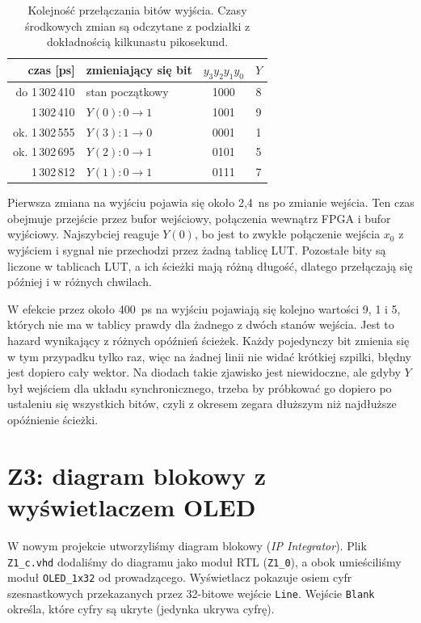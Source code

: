 \documentclass[11pt,a4paper]{article}
\begin{document}
\begin{table}[H]
\centering
\small
\begin{tabular}{rlcc}
\toprule
czas [ps] & zmieniający się bit & $y_3y_2y_1y_0$ & $Y$\\
\midrule
do 1\,302\,410   & stan początkowy        & 1000 & 8\\
1\,302\,410      & $Y(0)\colon 0 \to 1$   & 1001 & 9\\
ok. 1\,302\,555  & $Y(3)\colon 1 \to 0$   & 0001 & 1\\
ok. 1\,302\,695  & $Y(2)\colon 0 \to 1$   & 0101 & 5\\
1\,302\,812      & $Y(1)\colon 0 \to 1$   & 0111 & 7\\
\bottomrule
\end{tabular}
\caption{Kolejność przełączania bitów wyjścia. Czasy środkowych zmian są odczytane z podziałki z dokładnością kilkunastu pikosekund.}
\label{tab:hazard}
\end{table}

Pierwsza zmiana na wyjściu pojawia się około 2,4~ns po zmianie wejścia. Ten czas obejmuje przejście przez bufor wejściowy, połączenia wewnątrz FPGA i bufor wyjściowy. Najszybciej reaguje $Y(0)$, bo jest to zwykłe połączenie wejścia $x_0$ z wyjściem i sygnał nie przechodzi przez żadną tablicę LUT. Pozostałe bity są liczone w tablicach LUT, a ich ścieżki mają różną długość, dlatego przełączają się później i w różnych chwilach.

W efekcie przez około 400~ps na wyjściu pojawiają się kolejno wartości 9, 1 i 5, których nie ma w tablicy prawdy dla żadnego z dwóch stanów wejścia. Jest to hazard wynikający z różnych opóźnień ścieżek. Każdy pojedynczy bit zmienia się w tym przypadku tylko raz, więc na żadnej linii nie widać krótkiej szpilki, błędny jest dopiero cały wektor. Na diodach takie zjawisko jest niewidoczne, ale gdyby $Y$ był wejściem dla układu synchronicznego, trzeba by próbkować go dopiero po ustaleniu się wszystkich bitów, czyli z okresem zegara dłuższym niż najdłuższe opóźnienie ścieżki.

\section{Z3: diagram blokowy z wyświetlaczem OLED}

W nowym projekcie utworzyliśmy diagram blokowy (\emph{IP Integrator}). Plik \texttt{Z1\_c.vhd} dodaliśmy do diagramu jako moduł RTL (\texttt{Z1\_0}), a obok umieściliśmy moduł \texttt{OLED\_1x32} od prowadzącego. Wyświetlacz pokazuje osiem cyfr szesnastkowych przekazanych przez 32-bitowe wejście \texttt{Line}. Wejście \texttt{Blank} określa, które cyfry są ukryte (jedynka ukrywa cyfrę).
\end{document}
